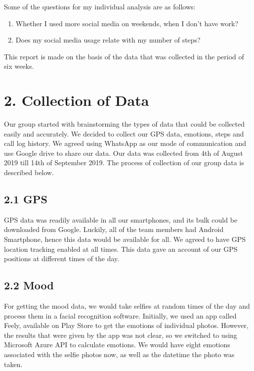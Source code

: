 \documentclass[
]{article}
\providecommand{\tightlist}{%
  \setlength{\itemsep}{0pt}\setlength{\parskip}{0pt}}
\begin{document}
Some of the questions for my individual analysis are as follows:

\begin{enumerate}
\def\labelenumi{\arabic{enumi}.}
\tightlist
\item
  Whether I used more social media on weekends, when I don't have work?
\item
  Does my social media usage relate with my number of steps?
\end{enumerate}

This report is made on the basis of the data that was collected in the
period of six weeks.

\hypertarget{collection-of-data}{%
\section{2. Collection of Data}\label{collection-of-data}}

Our group started with brainstorming the types of data that could be
collected easily and accurately. We decided to collect our GPS data,
emotions, steps and call log history. We agreed using WhatsApp as our
mode of communication and use Google drive to share our data. Our data
was collected from 4th of August 2019 till 14th of September 2019. The
process of collection of our group data is described below.

\hypertarget{gps}{%
\subsection{2.1 GPS}\label{gps}}

GPS data was readily available in all our smartphones, and its bulk
could be downloaded from Google. Luckily, all of the team members had
Android Smartphone, hence this data would be available for all. We
agreed to have GPS location tracking enabled at all times. This data
gave an account of our GPS positions at different times of the day.

\hypertarget{mood}{%
\subsection{2.2 Mood}\label{mood}}

For getting the mood data, we would take selfies at random times of the
day and process them in a facial recognition software. Initially, we
used an app called Feely, available on Play Store to get the emotions of
individual photos. However, the results that were given by the app was
not clear, so we switched to using Microsoft Azure API to calculate
emotions. We would have eight emotions associated with the selfie photos
now, as well as the datetime the photo was taken.
\end{document}
